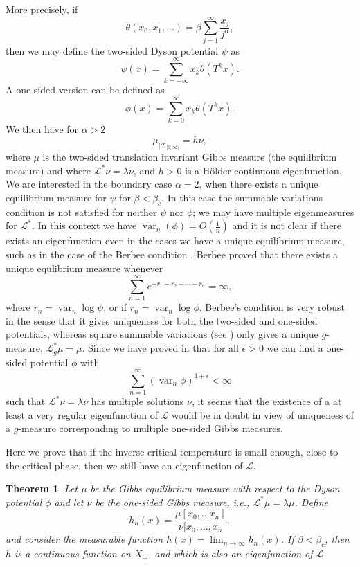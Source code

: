 \documentclass[11pt, a4paper, oneside]{article}
\newtheorem{thm}{Theorem}
\theoremstyle{definition}
\theoremstyle{remark}
\providecommand{\opn}{\operatorname}
\providecommand{\var}{\opn{var}}
\begin{document}
More precisely, if
$$\theta(x_0, x_1,\ldots)=\beta \sum_{j=1}^\infty \frac{x_j}{j^\alpha},$$
then we may define the two-sided Dyson potential $\psi$ as
$$\psi(x)=\sum_{k=-\infty}^\infty x_k \theta(T^k x).$$ 
A one-sided version can be defined as
$$\phi(x)=\sum_{k=0}^\infty x_k \theta (T^k x).$$
We then have for $\alpha>2$
$$\mu_{|{\mathcal F}_{[0,\infty)}}= h\nu,$$
where $\mu$ is the two-sided translation invariant Gibbs measure (the
equilibrium measure) and where ${\mathcal L}^*\nu=\lambda \nu$, and $h>0$ is a
H\"older continuous eigenfunction. We are interested in the boundary case
$\alpha=2$, when there exists a unique equilibrium measure for $\psi$ for
$\beta<\beta_c$. In this case the summable variations condition is not satisfied
for neither $\psi$ nor $\phi$; we may have multiple eigenmeasures for ${\mathcal
  L}^*$. In this context we have $\var_n(\phi)=O(\frac{1}{n})$ and it is not
clear if there exists an eigenfunction even in the cases we have a unique
equilibrium measure, such as in the case of the Berbee condition \cite{berbee2}.
Berbee proved that there exists a unique equlibrium measure whenever
\begin{equation}\label{berbee}
  \sum_{n=1}^\infty e^{-r_1-r_2-\cdots-r_n}=\infty,    
\end{equation}
where $r_n=\var_n \log \psi$, or if $r_n=\var_n \log \phi$. Berbee's condition is
very robust in the sense that it gives uniqueness for both the two-sided and
one-sided potentials, whereas square summable variations (see \cite{johob}) only
gives a unique $g$-measure, ${\mathcal L}_g^* \mu=\mu$. Since we have proved in
\cite{jop3} that for all $\epsilon>0$ we can find a one-sided potential $\phi$
with
$$\sum_{n=1}^\infty (\var_n \phi)^{1+\epsilon}<\infty$$
such that ${\mathcal L}^* \nu=\lambda \nu$ has multiple solutions $\nu$, it
seems that the existence of a at least a very regular eigenfunction of
${\mathcal L}$ would be in doubt in view of uniqueness of a $g$-measure
corresponding to multiple one-sided Gibbs measures.

Here we prove that if the inverse critical temperature is small enough, close to
the critical phase, then we still have an eigenfunction of ${\mathcal L}$.

\begin{thm}\label{main}
  Let $\mu$ be the Gibbs equilibrium measure with respect to the Dyson potential
  $\phi$ and let $\nu$ be the one-sided Gibbs measure, i.e., ${\mathcal
    L}^*\mu=\lambda \mu$. Define
$$h_n(x)=\frac{\mu[x_0,\ldots x_n]}{\nu[x_0,\ldots, x_n},$$
and consider the measurable function $h(x)=\lim_{n\to \infty}h_n(x)$. If
$\beta<\beta_c$, then $h$ is a continuous function on $X_+$, and which is also
an eigenfunction of ${\mathcal L}$.
\end{thm}
\end{document}
